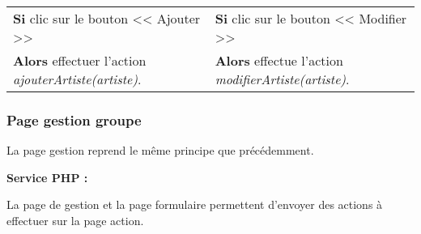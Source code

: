         \newpage
            
            \begin{center}
                \begin{tabular}{l | l}
                    \textbf{Si} clic sur le bouton << Ajouter >> & \textbf{Si} clic sur le bouton << Modifier >> \\
                    \textbf{Alors} effectuer l'action \emph{ajouterArtiste(artiste)}. & \textbf{Alors} effectue l'action \emph{modifierArtiste(artiste)}.
                \end{tabular}
            \end{center}
            
			

    \clearpage

		\subsubsection{Page gestion groupe}

			\begin{paragraphe}
                La page gestion reprend le même principe que précédemment. 
			\end{paragraphe}

			\begin{paragraphe}
				\textbf{Service PHP :}
			\end{paragraphe}
            
            \begin{paragraphe}
                La page de gestion et la page formulaire permettent d'envoyer des actions à effectuer sur la page action.
			\end{paragraphe}

